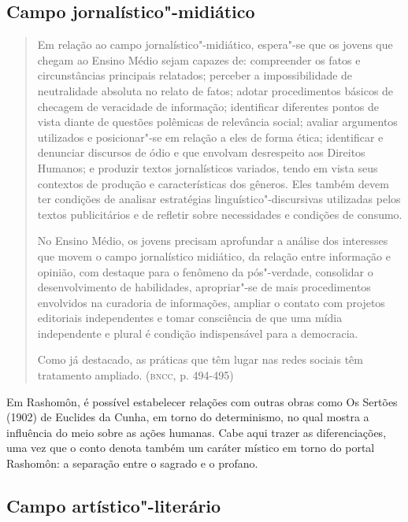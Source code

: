\documentclass[12pt]{extarticle}
\begin{document}
\subsection{Campo jornalístico"-midiático}

\begin{quote}
Em relação ao campo jornalístico"-midiático, espera"-se que os jovens
que chegam ao Ensino Médio sejam capazes de: compreender os fatos e
circunstâncias principais relatados; perceber a impossibilidade de
neutralidade absoluta no relato de fatos; adotar procedimentos básicos
de checagem de veracidade de informação; identificar diferentes pontos
de vista diante de questões polêmicas de relevância social; avaliar
argumentos utilizados e posicionar"-se em relação a eles de forma ética;
identificar e denunciar discursos de ódio e que envolvam desrespeito aos
Direitos Humanos; e produzir textos jornalísticos variados, tendo em
vista seus contextos de produção e características dos gêneros. Eles
também devem ter condições de analisar estratégias
linguístico"-discursivas utilizadas pelos textos publicitários e de
refletir sobre necessidades e condições de consumo.

No Ensino Médio, os jovens precisam aprofundar a análise dos interesses
que movem o campo jornalístico midiático, da relação entre informação e
opinião, com destaque para o fenômeno da pós"-verdade, consolidar o
desenvolvimento de habilidades, apropriar"-se de mais procedimentos
envolvidos na curadoria de informações, ampliar o contato com projetos
editoriais independentes e tomar consciência de que uma mídia
independente e plural é condição indispensável para a democracia.

Como já destacado, as práticas que têm lugar nas redes sociais têm
tratamento ampliado. (\textsc{bncc}, p. 494-495)
\end{quote}

Em Rashomôn, é possível estabelecer relações com outras obras como Os
Sertões (1902) de Euclides da Cunha, em torno do determinismo, no qual
mostra a influência do meio sobre as ações humanas. Cabe aqui trazer
as diferenciações, uma vez que o conto denota também um caráter
místico em torno do portal Rashomôn: a separação entre o sagrado e o
profano.

\subsection{Campo artístico"-literário}
\end{document}
